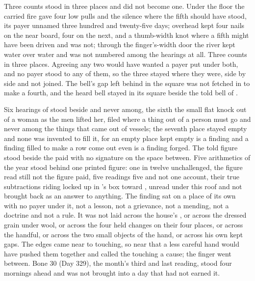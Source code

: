 \scenebreak

Three counts stood in three places and did not become one. Under the floor the carried fire gave four low pulls and the silence where the fifth should have stood, its payer unnamed three hundred and twenty-five days; overhead  kept four nails on the near board, four on the next, and a thumb-width knot where a fifth might have been driven and was not; through the finger's-width door the river kept water over water and was not numbered among the hearings at all. Three counts in three places. Agreeing any two would have wanted a payer put under both, and no payer stood to any of them, so the three stayed where they were, side by side and not joined. The bell's gap left behind in the square was not fetched in to make a fourth, and the heard bell stayed in its square beside the told bell of .

Six hearings of  stood beside and never among, the sixth the small flat knock out of a woman as the men lifted her, filed where a thing out of a person must go and never among the things that came out of vessels; the seventh place stayed empty and none was invented to fill it, for an empty place kept empty is a finding and a finding filled to make a row come out even is a finding forged. The told figure stood beside the paid with no signature on the space between. Five arithmetics of the year stood behind one printed figure: one in twelve unchallenged, the figure read still not the figure paid, five readings five and not one account, their true subtractions riding locked up  in 's box toward , unread under this roof and not brought back as an answer to anything. The finding sat on a place of its own with no payer under it, not a lesson, not a grievance, not a mending, not a doctrine and not a rule. It was not laid across the house's , or across the dressed grain under wool, or across the four held changes on their four places, or across the handful, or across the two small objects of the hand, or across his own kept gaps. The edges came near to touching, so near that a less careful hand would have pushed them together and called the touching a cause; the finger went between. Bone 30 (Day 329), the month's third and last reading, stood four mornings ahead and was not brought into a day that had not earned it.

